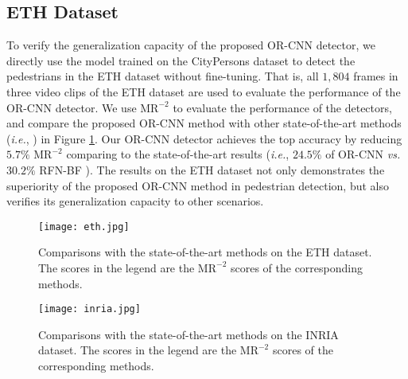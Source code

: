 \documentclass[runningheads]{llncs}
\def\ie{{\em i.e.}}
\begin{document}
\subsection{ETH Dataset}
To verify the generalization capacity of the proposed OR-CNN detector, we directly use the model trained on the CityPersons \cite{DBLP:conf/cvpr/ZhangBS17} dataset to detect the pedestrians in the ETH dataset \cite{DBLP:conf/iccv/EssLG07} without fine-tuning. That is, all $1,804$ frames in three video clips of the ETH dataset \cite{DBLP:conf/iccv/EssLG07} are used to evaluate the performance of the OR-CNN detector. We use $\text{MR}^{-2}$ to evaluate the performance of the detectors, and compare the proposed OR-CNN method with other state-of-the-art methods (\ie, \cite{DBLP:conf/cvpr/DalalT05,DBLP:journals/ijcv/ViolaJ04,DBLP:conf/cvpr/BenensonMTG13,DBLP:conf/eccv/PaisitkriangkraiSH14,DBLP:conf/cvpr/TianLWT15,DBLP:conf/eccv/ZhangLLH16,DBLP:conf/cvpr/OuyangW12,DBLP:conf/iccv/OuyangW13,DBLP:conf/iccv/MathiasBTG13,DBLP:journals/ijcv/ShenWPH13,DBLP:conf/cvpr/OuyangZW13,DBLP:conf/iccv/MarinVLAL13,DBLP:conf/nips/NamDH14,DBLP:conf/cvpr/LuoTWT14}) in Figure \ref{fig:eth}. Our OR-CNN detector achieves the top accuracy by reducing $5.7\%$ $\text{MR}^{-2}$ comparing to the state-of-the-art results (\ie, $24.5\%$ of OR-CNN {\em vs.} $30.2\%$ RFN-BF \cite{DBLP:conf/eccv/ZhangLLH16}). The results on the ETH dataset not only demonstrates the superiority of the proposed OR-CNN method in pedestrian detection, but also verifies its generalization capacity to other scenarios.

\begin{figure}[t] \centering
\texttt{[image: eth.jpg]}
\caption{Comparisons with the state-of-the-art methods on the ETH dataset. The scores in the legend are the ${\text{MR}}^{-2}$ scores of the corresponding methods.}
\label{fig:eth}
\end{figure}

\begin{figure}[t]
\centering
\texttt{[image: inria.jpg]}
\caption{Comparisons with the state-of-the-art methods on the INRIA dataset. The scores in the legend are the ${\text{MR}}^{-2}$ scores of the corresponding methods.}
\label{fig:inria}
\end{figure}
\end{document}
